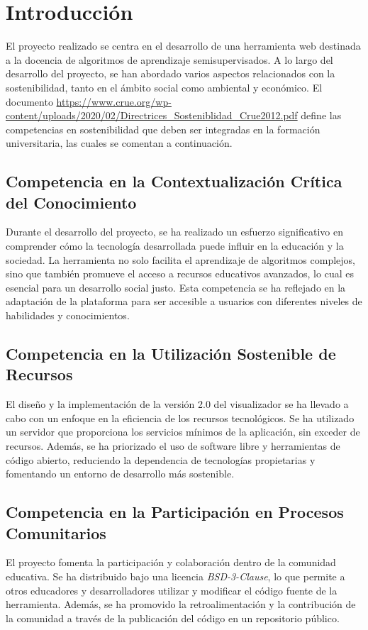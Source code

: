 
\section{Introducción}
El proyecto realizado se centra en el desarrollo de una herramienta web destinada a la docencia de algoritmos de aprendizaje semisupervisados. A lo largo del desarrollo del proyecto, se han abordado varios aspectos relacionados con la sostenibilidad, tanto en el ámbito social como ambiental y económico.
El documento \url{https://www.crue.org/wp-content/uploads/2020/02/Directrices_Sosteniblidad_Crue2012.pdf} define las competencias en sostenibilidad que deben ser integradas en la formación universitaria, las cuales se comentan a continuación.

\subsection{Competencia en la Contextualización Crítica del Conocimiento}
Durante el desarrollo del proyecto, se ha realizado un esfuerzo significativo en comprender cómo la tecnología desarrollada puede influir en la educación y la sociedad. La herramienta no solo facilita el aprendizaje de algoritmos complejos, sino que también promueve el acceso a recursos educativos avanzados, lo cual es esencial para un desarrollo social justo. Esta competencia se ha reflejado en la adaptación de la plataforma para ser accesible a usuarios con diferentes niveles de habilidades y conocimientos.

\subsection{Competencia en la Utilización Sostenible de Recursos}
El diseño y la implementación de la versión 2.0 del visualizador se ha llevado a cabo con un enfoque en la eficiencia de los recursos tecnológicos. Se ha utilizado un servidor que proporciona los servicios mínimos de la aplicación, sin exceder de recursos. Además, se ha priorizado el uso de software libre y herramientas de código abierto, reduciendo la dependencia de tecnologías propietarias y fomentando un entorno de desarrollo más sostenible.

\subsection{Competencia en la Participación en Procesos Comunitarios}
El proyecto fomenta la participación y colaboración dentro de la comunidad educativa. Se ha distribuido bajo una licencia \textit{BSD-3-Clause}, lo que permite a otros educadores y desarrolladores utilizar y modificar el código fuente de la herramienta. Además, se ha promovido la retroalimentación y la contribución de la comunidad a través de la publicación del código en un repositorio público.
